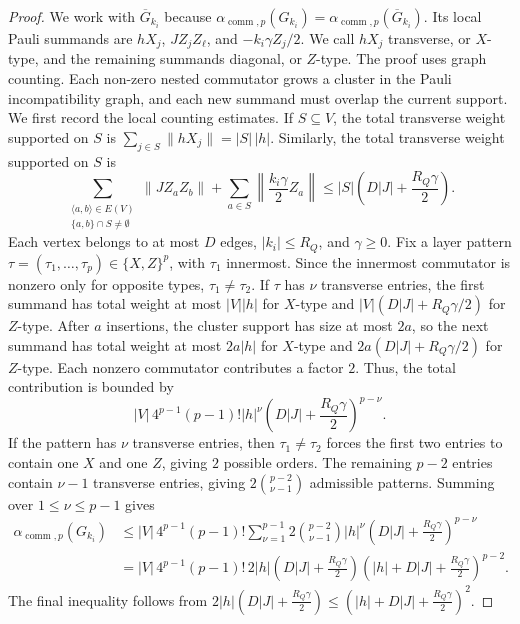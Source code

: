 \documentclass[10pt,reqno]{article}
\numberwithin{equation}{section}
\theoremstyle{plain}
\theoremstyle{definition}
\begin{document}
\begin{proof}
We work with \(\overline G_{k_i}\) because \(\alpha_{\operatorname{comm},p}(G_{k_i})=\alpha_{\operatorname{comm},p}(\overline G_{k_i})\). Its local Pauli summands are \(hX_j\), \(JZ_jZ_\ell\), and \(-k_i\gamma Z_j/2\). We call \(hX_j\) transverse, or \(X\)-type, and the remaining summands diagonal, or \(Z\)-type. The proof uses graph counting. Each non-zero nested commutator grows a cluster in the Pauli incompatibility graph, and each new summand must overlap the current support. We first record the local counting estimates. If \(S\subseteq V\), the total transverse weight supported on \(S\) is $\sum_{j\in S}\|hX_j\|  = |S|\,|h|$. Similarly, the total transverse weight supported on \(S\) is
\begin{equation}
\sum_{\substack{\langle a,b\rangle\in E(V)\\ \{a,b\}\cap S\neq\emptyset}} \|JZ_aZ_b\| + \sum_{a\in S} \left\| \frac{k_i\gamma}{2}Z_a \right\| \leq |S|\left(D|J|+\frac{R_Q\gamma}{2}\right).
\label{eq:tfim-diagonal-weight-on-S}
\end{equation}
Each vertex belongs to at most \(D\) edges, \(|k_i|\leq R_Q\), and \(\gamma\geq0\). Fix a layer pattern \(\tau=(\tau_1,\ldots,\tau_p)\in\{X,Z\}^p\), with \(\tau_1\) innermost. Since the innermost commutator is nonzero only for opposite types, \(\tau_1\neq\tau_2\). If \(\tau\) has \(\nu\) transverse entries, the first summand has total weight at most \(|V||h|\) for \(X\)-type and \(|V|(D|J|+R_Q\gamma/2)\) for \(Z\)-type. After \(a\) insertions, the cluster support has size at most \(2a\), so the next summand has total weight at most \(2a|h|\) for \(X\)-type and \(2a(D|J|+R_Q\gamma/2)\) for \(Z\)-type. Each nonzero commutator contributes a factor \(2\). Thus, the total contribution is bounded by
\begin{equation}
|V|\,4^{p-1}(p-1)! |h|^\nu \left(D|J|+\frac{R_Q\gamma}{2}\right)^{p-\nu}.
\label{eq:tfim-fixed-pattern-bound}
\end{equation}
If the pattern has \(\nu\) transverse entries, then \(\tau_1\neq\tau_2\) forces the first two entries to contain one \(X\) and one \(Z\), giving \(2\) possible orders. The remaining \(p-2\) entries contain \(\nu-1\) transverse entries, giving \(2\binom{p-2}{\nu-1}\) admissible patterns. Summing over \(1\leq\nu\leq p-1\) gives
\begin{align}
\alpha_{\operatorname{comm},p}(G_{k_i}) &\leq |V|\,4^{p-1}(p-1)! \sum_{\nu=1}^{p-1} 2\binom{p-2}{\nu-1} |h|^\nu \left(D|J|+\frac{R_Q\gamma}{2}\right)^{p-\nu} \\ &= |V|\,4^{p-1}(p-1)! \,2|h| \left(D|J|+\frac{R_Q\gamma}{2}\right) \left(|h|+D|J|+\frac{R_Q\gamma}{2}\right)^{p-2}.
\end{align}
The final inequality follows from \(2|h|(D|J|+\frac{R_Q\gamma}{2}) \leq (|h|+D|J|+\frac{R_Q\gamma}{2})^2\).
\end{proof}
\end{document}
